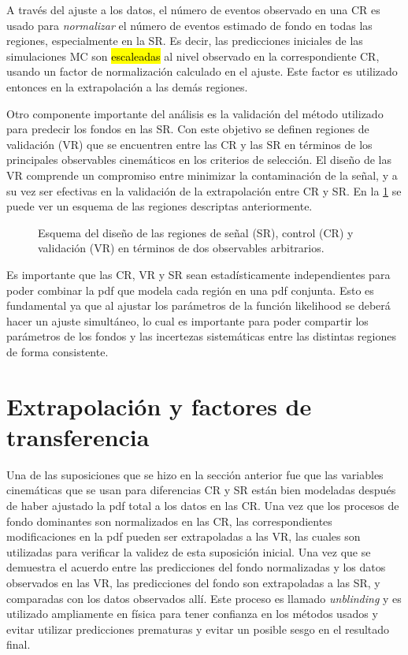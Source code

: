 A través del ajuste a los datos, el número de eventos observado en una CR es
usado para \emph{normalizar} el número de eventos estimado de fondo en todas las
regiones, especialmente en la SR. Es decir, las predicciones iniciales de las
simulaciones MC son \hl{escaleadas} al nivel observado en la correspondiente CR,
usando un factor de normalización calculado en el ajuste. Este factor es
utilizado entonces en la extrapolación a las demás regiones.

Otro componente importante del análisis es la validación del método utilizado
para predecir los fondos en las SR. Con este objetivo se definen regiones de
validación (VR) que se encuentren entre las CR y las SR en términos de los
principales observables cinemáticos en los criterios de selección. El diseño de
las VR comprende un compromiso entre minimizar la contaminación de la señal, y a su
vez ser efectivas en la validación de la extrapolación entre CR y SR. En la
\cref{fig:regions_sketch} se puede ver un esquema de las regiones descriptas
anteriormente.

\begin{figure}[h]
  \centering 
  \caption{Esquema del diseño de las regiones de señal (SR), control (CR) y
    validación (VR) en términos de dos observables arbitrarios.}
  \label{fig:regions_sketch}
\end{figure}

Es importante que las CR, VR y SR sean estadísticamente independientes para
poder combinar la pdf que modela cada región en una pdf conjunta. Esto es
fundamental ya que al ajustar los parámetros de la función likelihood se deberá
hacer un ajuste simultáneo, lo cual es importante para poder compartir los
parámetros de los fondos y las incertezas sistemáticas entre las distintas
regiones de forma consistente.

\section{Extrapolación y factores de transferencia}

Una de las suposiciones que se hizo en la sección anterior fue que las variables
cinemáticas que se usan para diferencias CR y SR están bien modeladas después de
haber ajustado la pdf total a los datos en las CR. Una vez que los procesos de
fondo dominantes son normalizados en las CR, las correspondientes modificaciones
en la pdf pueden ser extrapoladas a las VR, las cuales son utilizadas para
verificar la validez de esta suposición inicial. Una vez que se demuestra el
acuerdo entre las predicciones del fondo normalizadas y los datos observados en
las VR, las predicciones del fondo son extrapoladas a las SR, y comparadas con
los datos observados allí. Este proceso es llamado \emph{unblinding} y es
utilizado ampliamente en física para tener confianza en los métodos usados y
evitar utilizar predicciones prematuras y evitar un posible sesgo en el
resultado final.

